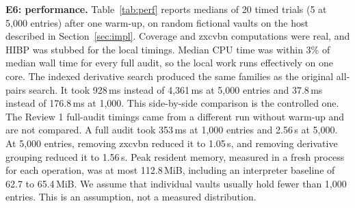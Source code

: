 \documentclass[conference]{IEEEtran}
\begin{document}
\textbf{E6: performance.} Table~\ref{tab:perf} reports medians of 20 timed trials (5 at 5,000 entries) after one warm-up, on random fictional vaults on the host described in Section~\ref{sec:impl}. Coverage and zxcvbn computations were real, and HIBP was stubbed for the local timings. Median CPU time was within 3\% of median wall time for every full audit, so the local work runs effectively on one core. The indexed derivative search produced the same families as the original all-pairs search. It took 928\,ms instead of 4,361\,ms at 5,000 entries and 37.8\,ms instead of 176.8\,ms at 1,000. This side-by-side comparison is the controlled one. The Review 1 full-audit timings came from a different run without warm-up and are not compared. A full audit took 353\,ms at 1,000 entries and 2.56\,s at 5,000. At 5,000 entries, removing zxcvbn reduced it to 1.05\,s, and removing derivative grouping reduced it to 1.56\,s. Peak resident memory, measured in a fresh process for each operation, was at most 112.8\,MiB, including an interpreter baseline of 62.7 to 65.4\,MiB. We assume that individual vaults usually hold fewer than 1,000 entries. This is an assumption, not a measured distribution.
\end{document}
